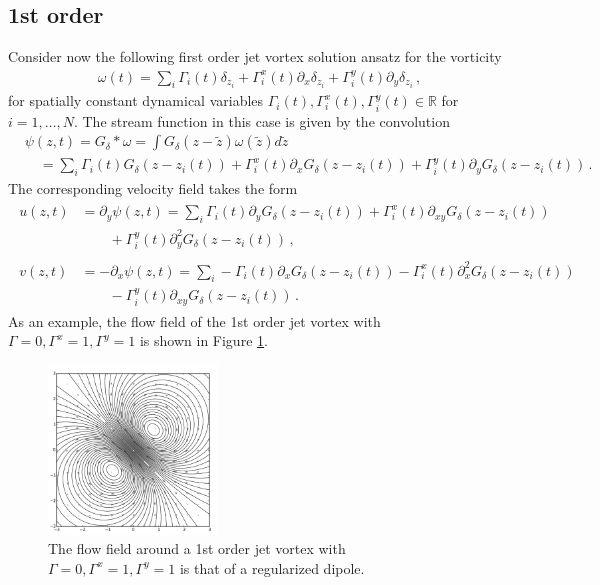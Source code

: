 \documentclass[12pt]{amsart}
\newcommand{\R}{\ensuremath{\mathbb{R}}}
\theoremstyle{remark}
\begin{document}
\subsection{1st order}
Consider now the following first order jet vortex solution ansatz for the vorticity
\begin{align}
  \omega(t) = \sum_{i} \Gamma_i(t) \delta_{z_i} 
  + \Gamma_i^x(t) \partial_x \delta_{z_i}
  + \Gamma_i^y(t) \partial_y \delta_{z_i}\label{eq:ansatz 1} \,,
\end{align}
for spatially constant dynamical variables $\Gamma_i(t),\Gamma_i^x(t),\Gamma_i^y(t) \in \R$ for $i = 1,\dots,N$.
The stream function in this case is given by the convolution
\begin{align*}
  &\psi(z,t) = G_\delta * \omega = \int G_\delta(z - \tilde{z}) \omega(\tilde{z}) d \tilde{z} \\
  &\quad = \sum_{i} \Gamma_i(t) G_\delta (z-z_i(t) )  + \Gamma_i^x(t) \partial_x G_\delta( z - z_i(t))  + \Gamma_i^y(t) \partial_y G_\delta( z- z_i(t))
  \,.
\end{align*}
The corresponding velocity field takes the form
\begin{align}
\begin{array}{ll}
  u(z,t) &= \partial_y \psi(z,t) = \sum_{i} \Gamma_i(t) \partial_yG_\delta (z-z_i(t) ) + \Gamma_i^x(t) \partial_{xy} G_\delta( z-z_i(t))\\
  &\qquad + \Gamma_i^y(t) \partial_y^2 G_\delta( z-z_i(t)) \,,\\ \\
  v(z,t) &=  - \partial_x \psi(z,t) = \sum_{i} -\Gamma_i(t) \partial_x G_\delta (z-z_i(t) ) - \Gamma_i^x(t) \partial_x^2 G_\delta( z-z_i(t)) \\
  &\qquad - \Gamma_i^y(t) \partial_{xy} G_\delta( z-z_i(t))\,.
\end{array}
\label{eq:u 1}
\end{align}
As an example, the flow field of the 1st order jet vortex with $\Gamma = 0,\Gamma^x = 1,\Gamma^y=1$ is shown in Figure \ref{fig:one}.

\begin{figure}[h] %
   \centering
   \includegraphics[clip,trim=0.6in 0.5in 0.6in 0.6in,width=0.4\textwidth]{./images/one.pdf} 
   \caption{The flow field around a 1st order jet vortex with $\Gamma = 0,\Gamma^x = 1,\Gamma^y=1$ is that of a regularized dipole.}
   \label{fig:one}
\end{figure}
\end{document}
